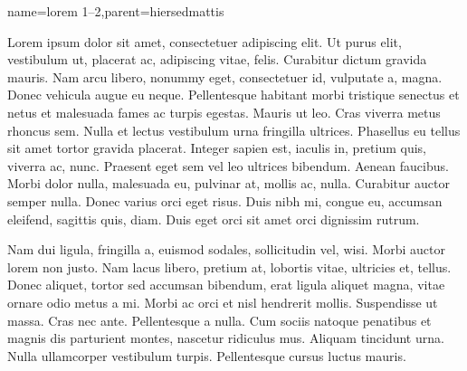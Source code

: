 

{name={lorem 1--2},parent={hiersedmattis}}%
{%
Lorem ipsum dolor sit amet, consectetuer adipiscing elit. Ut purus elit,
vestibulum ut, placerat ac, adipiscing vitae, felis. Curabitur
dictum gravida mauris. Nam arcu libero, nonummy eget, consectetuer
id, vulputate a, magna. Donec vehicula augue eu neque. Pellentesque
habitant morbi tristique senectus et netus et malesuada fames ac
turpis egestas. Mauris ut leo. Cras viverra metus rhoncus sem. Nulla
et lectus vestibulum urna fringilla ultrices.  Phasellus eu tellus
sit amet tortor gravida placerat. Integer sapien est, iaculis in,
pretium quis, viverra ac, nunc. Praesent eget sem vel leo ultrices
bibendum. Aenean faucibus. Morbi dolor nulla, malesuada eu, pulvinar
at, mollis ac, nulla.  Curabitur auctor semper nulla. Donec varius
orci eget risus. Duis nibh mi, congue eu, accumsan eleifend,
sagittis quis, diam. Duis eget orci sit amet orci dignissim rutrum.

Nam dui ligula, fringilla a, euismod sodales, sollicitudin vel,
wisi. Morbi auctor lorem non justo. Nam lacus libero, pretium at,
lobortis vitae, ultricies et, tellus. Donec aliquet, tortor sed
accumsan bibendum, erat ligula aliquet magna, vitae ornare odio
metus a mi. Morbi ac orci et nisl hendrerit mollis. Suspendisse ut
massa. Cras nec ante. Pellentesque a nulla.  Cum sociis natoque
penatibus et magnis dis parturient montes, nascetur ridiculus mus.
Aliquam tincidunt urna. Nulla ullamcorper vestibulum turpis.
Pellentesque cursus luctus mauris.%
}

